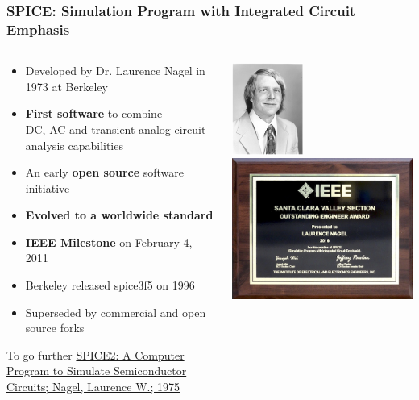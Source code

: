 
\begin{frame}
  \frametitle{SPICE: Simulation Program with Integrated Circuit Emphasis}
  \begin{columns}
    \begin{column}{.7\textwidth}
      \begin{itemize}
      \item Developed by Dr. Laurence Nagel in 1973 at Berkeley %
      \item \textbf{First software} to combine \\
        DC, AC and transient analog circuit analysis capabilities
      \item An early \textbf{open source} software initiative
      \item \textbf{Evolved to a worldwide standard} %
      \item \textbf{IEEE Milestone} on February 4, 2011
      \item Berkeley released spice3f5 on 1996
      \item Superseded by commercial and open source forks
      \end{itemize}
      {\tiny To go further
        \href{https://www2.eecs.berkeley.edu/Pubs/TechRpts/1975/9602.html}%
        {SPICE2: A Computer Program to Simulate Semiconductor Circuits; Nagel, Laurence W.; 1975}
      }
    \end{column}
    \begin{column}{.3\textwidth}
      \begin{center}
        \includegraphics[height=3cm]{images/Larry-Nagel-portrait-young.png} \\[1cm]
        \includegraphics[width=.7\textwidth]{images/Nagel_Plaque-SCV-2016.png}

\end{center}
\end{column}
\end{columns}
\end{frame}
